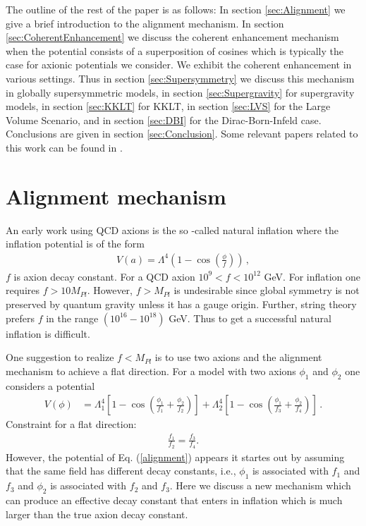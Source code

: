 \documentclass[12pt]{article}
\begin{document}
The outline of the rest of the paper is as follows: In section \ref{sec:Alignment} we give a brief introduction to the alignment mechanism.
In section \ref{sec:CoherentEnhancement} we discuss the coherent enhancement mechanism when the potential consists of a superposition of cosines which is typically the case for axionic potentials we consider.
We exhibit the coherent enhancement in various settings.
Thus in section \ref{sec:Supersymmetry} we discuss this mechanism in globally supersymmetric models, in section \ref{sec:Supergravity} for supergravity models, in section \ref{sec:KKLT} for KKLT, in section \ref{sec:LVS} for the Large Volume Scenario, and in section \ref{sec:DBI} for the Dirac-Born-Infeld case.
Conclusions are given in section \ref{sec:Conclusion}.
Some relevant papers related to this work can be found in \cite{BlancoPillado:2006he,Conlon:2005jm,Ben-Dayan:2014lca,Gao:2014uha}.

\section{Alignment mechanism \label{sec:Alignment}}

An early work using QCD axions is the so -called natural inflation
where the inflation potential is of the form
\begin{align}
  V(a) = \Lambda^4 \left(1- \cos(\frac{\phi}{f})\right)\,,
\end{align}
$f $ is axion decay constant.
For a QCD axion $10^9 < f <10^{12}$ GeV.
For inflation one requires $f> 10 M_{Pl}$. However,
$f>M_{Pl}$ is undesirable since global symmetry is not preserved by quantum gravity
unless it has a gauge origin.
Further, string theory prefers $f$ in the range $ (10^{16}-10^{18})$ GeV.
Thus to get a successful natural inflation is difficult.


One suggestion to realize $f< M_{Pl}$ is to use two axions and the alignment mechanism to achieve a flat direction.
For a model with two axions $\phi_1$ and $\phi_2$ one considers a potential
\begin{align}
  V(\phi) & = \Lambda^4_1 \left[1- \cos\left(\frac{\phi_1}{f_1} + \frac{\phi_2}{f_2}\right)\right]
  + \Lambda^4_2 \left[1- \cos\left(\frac{\phi_1}{f_3} + \frac{\phi_2}{f_4}\right)\right]\,.
  \label{alignment}
\end{align}
Constraint for a flat direction:
\begin{align}
  \frac{f_1}{f_2}= \frac{f_3}{f_4}.
\end{align}
However, the potential of Eq. (\ref{alignment}) appears it startes out by assuming that the same field
has different decay constants, i.e., $\phi_1$ is associated with $f_1$ and $f_3$ and $\phi_2$ is associated with
$f_2$ and $f_3$. Here we discuss a new mechanism which can produce an effective decay constant
that enters in inflation which is much larger than the true axion decay constant.
\end{document}
